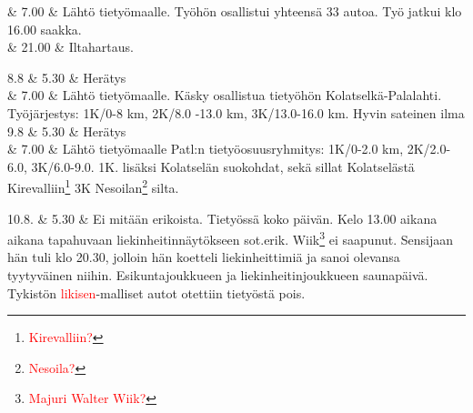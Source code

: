 \documentclass[11pt,a5paper,oneside]{book}
\begin{document}
& 7.00 & Lähtö tietyömaalle. Työhön osallistui yhteensä 33 autoa. \newline Työ jatkui klo 16.00 saakka. \\

& 21.00 & Iltahartaus. \\

\taulustop


8.8 & 5.30 & Herätys \\

& 7.00 & Lähtö tietyömaalle. \newline Käsky osallistua tietyöhön Kolatselkä-Palalahti. \newline Työjärjestys: 1K/0-8 km, 2K/8.0 -13.0 km, 3K/13.0-16.0 km. \newline Hyvin sateinen ilma \newline\newline\newline\newline\newline\newline \\

9.8 & 5.30 & Herätys \\

& 7.00 & Lähtö tietyömaalle \newline Patl:n tietyöosuusryhmitys: \newline 1K/0-2.0 km, 2K/2.0-6.0, 3K/6.0-9.0. 1K. lisäksi Kolatselän suokohdat, sekä sillat Kolatselästä Kirevalliin\footnote{\textcolor{red}{Kirevalliin?}} 3K Nesoilan\footnote{\textcolor{red}{Nesoila?}} silta. \\
\newpage

10.8. & 5.30 & Ei mitään erikoista. Tietyössä koko päivän. \newline Kelo 13.00 aikana aikana tapahuvaan liekinheitinnäytökseen sot.erik. \newline Wiik\footnote{\textcolor{red}{Majuri Walter Wiik?}} ei saapunut. \newline Sensijaan hän tuli klo 20.30, jolloin hän koetteli liekinheittimiä ja sanoi olevansa tyytyväinen niihin. \newline Esikuntajoukkueen ja liekinheitinjoukkueen saunapäivä. \newline Tykistön \textcolor{red}{likisen}-malliset autot otettiin tietyöstä pois. \newline\newline\newline\newline \\
\end{document}
